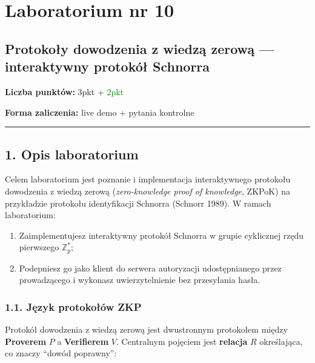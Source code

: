 \documentclass[
]{article}
\author{}
\date{}
\providecommand{\tightlist}{%
  \setlength{\itemsep}{0pt}\setlength{\parskip}{0pt}}
\let\oldrule\rule
\renewcommand{\rule}[2]{\noindent\oldrule{\linewidth}{0.4pt}}
\begin{document}
\section{Laboratorium nr 10}\label{laboratorium-nr-10}

\subsection{Protokoły dowodzenia z wiedzą zerową --- interaktywny
protokół
Schnorra}\label{protokoux142y-dowodzenia-z-wiedzux105-zerowux105-interaktywny-protokuxf3ux142-schnorra}

\textbf{Liczba punktów:} 3pkt + \textcolor{green}{2pkt}

\textbf{Forma zaliczenia:} live demo + pytania kontrolne

\begin{center}\rule{0.5\linewidth}{0.5pt}\end{center}

\subsection{1. Opis laboratorium}\label{opis-laboratorium}

Celem laboratorium jest poznanie i implementacja interaktywnego
protokołu dowodzenia z wiedzą zerową (\emph{zero-knowledge proof of
knowledge}, ZKPoK) na przykładzie protokołu identyfikacji Schnorra
(Schnorr 1989). W ramach laboratorium:

\begin{enumerate}
\def\labelenumi{\arabic{enumi}.}
\tightlist
\item
  Zaimplementujesz interaktywny protokół Schnorra w grupie cyklicznej
  rzędu pierwszego \(\mathbb{Z}^*_p\);
\item
  Podepniesz go jako klient do serwera autoryzacji udostępnianego przez
  prowadzącego i wykonasz uwierzytelnienie bez przesyłania hasła.
\end{enumerate}

\subsubsection{1.1. Język protokołów
ZKP}\label{jux119zyk-protokoux142uxf3w-zkp}

Protokół dowodzenia z wiedzą zerową jest dwustronnym protokołem między
\textbf{Proverem} \(P\) a \textbf{Verifierem} \(V\). Centralnym pojęciem
jest \textbf{relacja} \(R\) określająca, co znaczy ``dowód poprawny'':
\end{document}
